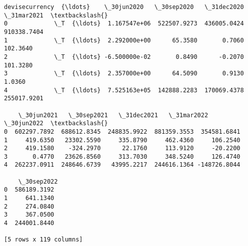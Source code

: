 \documentclass[11pt]{article}
\begin{document}
\begin{Verbatim}[commandchars=\\\{\}]
  devisecurrency  {\ldots}    \_30jun2020   \_30sep2020   \_31dec2020   \_31mar2021  \textbackslash{}
0             \_T  {\ldots}  1.167547e+06  522507.9273  436005.0424  910338.7404
1             \_T  {\ldots}  2.292000e+00      65.3580       0.7060     102.3640
2             \_T  {\ldots} -6.500000e-02       0.8490      -0.2070     101.3280
3             \_T  {\ldots}  2.357000e+00      64.5090       0.9130       1.0360
4             \_T  {\ldots}  7.525163e+05  142888.2283  170069.4378  255017.9201

    \_30jun2021   \_30sep2021   \_31dec2021   \_31mar2022   \_30jun2022  \textbackslash{}
0  602297.7892  688612.8345  248835.9922  881359.3553  354581.6841
1     419.6350   23302.5590     335.8790     462.4360     106.2540
2     419.1580    -324.2970      22.1760     113.9120     -20.2200
3       0.4770   23626.8560     313.7030     348.5240     126.4740
4  262237.0911  248646.6739   43995.2217  244616.1364 -148726.8044

    \_30sep2022
0  586189.3192
1     641.1340
2     274.0840
3     367.0500
4  244001.8440

[5 rows x 119 columns]
    \end{Verbatim}
\end{document}
